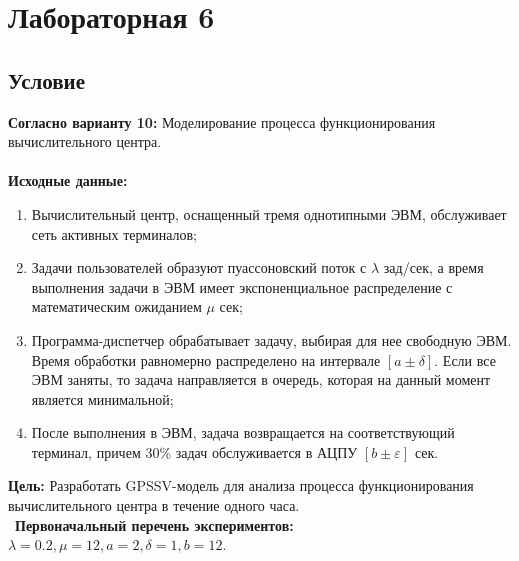 \section{Лабораторная 6}

\subsection{Условие}

\textbf{Согласно варианту 10:}
Моделирование процесса функционирования вычислительного центра.\\
\\
\textbf{Исходные данные:}
\begin{enumerate}
	\item Вычислительный центр, оснащенный тремя однотипными ЭВМ, обслуживает сеть активных терминалов;
	\item Задачи пользователей образуют пуассоновский поток с $\lambda$ зад/сек, а время выполнения задачи в ЭВМ имеет экспоненциальное распределение с математическим ожиданием $\mu$ сек;
	\item Программа-диспетчер обрабатывает задачу, выбирая для нее свободную ЭВМ. Время обработки равномерно распределено на интервале $[a\pm\delta]$. Если все ЭВМ заняты, то задача направляется в очередь, которая на данный момент является минимальной;
	\item После выполнения в ЭВМ, задача возвращается на соответствующий терминал, причем 30\% задач обслуживается в АЦПУ $[b\pm\varepsilon]$ сек.
\end{enumerate}
\textbf{Цель:} Разработать GPSSV-модель для анализа процесса функционирования вычислительного центра в течение одного часа.\\
\
\textbf{Первоначальный перечень экспериментов:} $\lambda=0.2, \mu=12, a=2, \delta=1, b=12$.
